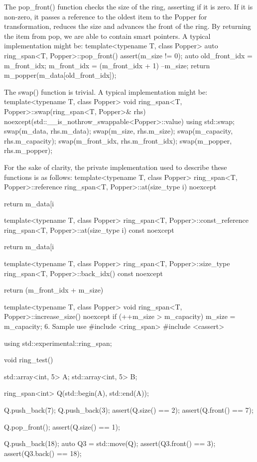 {The pop_front() function checks the size of the ring, asserting if it is zero.  If it is non-zero, it passes a reference to the oldest item to the Popper for transformation, reduces the size and advances the front of the ring.  By returning the item from pop, we are able to contain smart pointers.  A typical implementation might be:
template<typename T, class Popper>
auto ring_span<T, Popper>::pop_front()
{
  assert(m_size != 0);
  auto old_front_idx = m_front_idx;
  m_front_idx = (m_front_idx + 1) %
  --m_size;
  return m_popper(m_data[old_front_idx]);
}
 
The swap() function is trivial. A typical implementation might be:
template<typename T, class Popper>
void ring_span<T, Popper>::swap(ring_span<T, Popper>& rhs) noexcept(std::__is_nothrow_swappable<Popper>::value)
{
  using std::swap;
  swap(m_data, rhs.m_data);
  swap(m_size, rhs.m_size);
  swap(m_capacity, rhs.m_capacity);
  swap(m_front_idx, rhs.m_front_idx);
  swap(m_popper, rhs.m_popper);
}
 
For the sake of clarity, the private implementation used to describe these functions is as follows:
template<typename T, class Popper>
ring_span<T, Popper>::reference ring_span<T, Popper>::at(size_type i) noexcept
{ return m_data[i %
 
template<typename T, class Popper>
ring_span<T, Popper>::const_reference ring_span<T, Popper>::at(size_type i) const noexcept
{ return m_data[i %
 
template<typename T, class Popper>
ring_span<T, Popper>::size_type ring_span<T, Popper>::back_idx() const noexcept
{ return (m_front_idx + m_size) %
 
template<typename T, class Popper>
void ring_span<T, Popper>::increase_size() noexcept
{ if (++m_size > m_capacity) { m_size = m_capacity; } }
6. Sample use
#include <ring_span>
#include <cassert>
 
using std::experimental::ring_span;
 
void ring_test()
{
  std::array<int, 5> A;
  std::array<int, 5> B;
 
  ring_span<int> Q(std::begin(A), std::end(A));
 
  Q.push_back(7);
  Q.push_back(3);
  assert(Q.size() == 2);
  assert(Q.front() == 7);
 
  Q.pop_front();
  assert(Q.size() == 1);
 
  Q.push_back(18);
  auto Q3 = std::move(Q);
  assert(Q3.front() == 3);
  assert(Q3.back() == 18);
 
}}}}}
